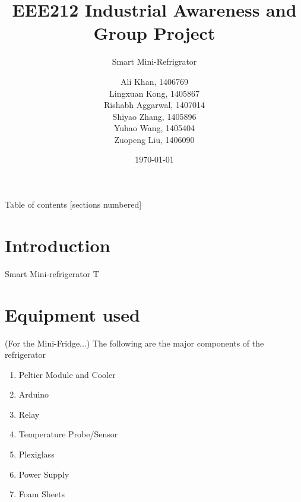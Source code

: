 \documentclass[10pt]{beamer}
\title{EEE212 Industrial Awareness and Group Project}
\subtitle{Smart Mini-Refrigrator}
\date{\today}
\author{Ali Khan, 1406769\\Lingxuan Kong, 1405867\\Rishabh Aggarwal, 1407014\\Shiyao Zhang, 1405896\\Yuhao Wang, 1405404\\Zuopeng Liu, 1406090}
\institute{Department of Electrical and Electronics Engineering, XJTLU}
\begin{document}
\maketitle
{
\begin{frame}{Table of contents}
  [sections numbered]
  \tableofcontents[hideallsubsections]
\end{frame}
}
\section{Introduction}
{
\begin{frame}[fragile]{Smart Mini-refrigerator}
	T
\end{frame}
}


\section{Equipment used}
{	
	\begin{frame}(For the Mini-Fridge...)
	The following are the major components of the refrigerator
	\begin{enumerate}[<+- | alert@+>]
		\item Peltier Module and Cooler
		\item Arduino
		\item Relay
		\item Temperature Probe/Sensor
		\item Plexiglass
		\item Power Supply
		\item Foam Sheets
	\end{enumerate}
\end{frame}
}
\end{document}
